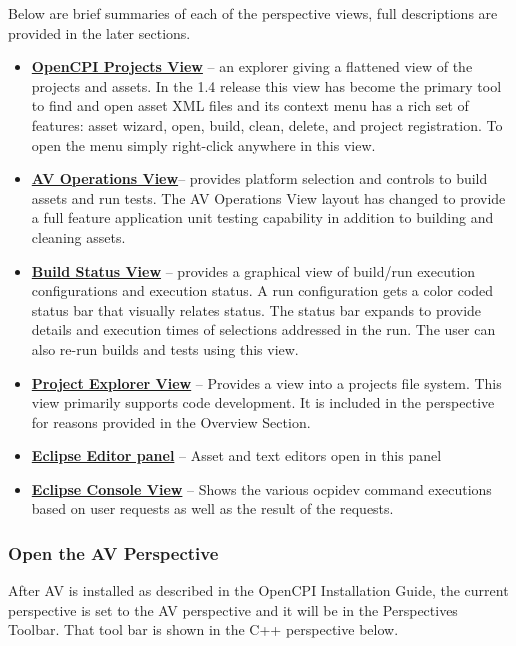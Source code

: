 Below are brief summaries of each of the perspective views, full descriptions are provided in the later sections.
\begin{itemize}
\item []	\hyperlink{OpenCPI Projects View Features}{\textbf{OpenCPI Projects View}} – an explorer giving a flattened view of the projects and assets. In the 1.4 release this view has become the primary tool to find and open asset XML files and its context menu has a rich set of features: asset wizard, open, build, clean, delete, and project registration. To open the menu simply right-click anywhere in this view.
\item [] \hyperlink{Operations View }{\textbf{AV Operations View}}– provides platform selection and controls to build assets and run tests. The AV Operations View layout has changed to provide a full feature application unit testing capability in addition to building and cleaning assets.
\item []	\hyperlink{Build Status View Features}{\textbf{Build Status View}} – provides a graphical view of build/run execution configurations and execution status. A run configuration gets a color coded status bar that visually relates status. The status bar expands to provide details and execution times of selections addressed in the run. The user can also re-run builds and tests using this view.
\item [] \hyperlink{Project Explorer View}{\textbf{Project Explorer View}} – Provides a view into a projects file system. This view primarily supports code development. It is included in the perspective for reasons provided in the Overview Section.
\item [] \hyperlink{Editor panel} {\textbf{Eclipse Editor panel}} – Asset and text editors open in this panel
\item [] \hyperlink{Eclipse Console View} {\textbf{Eclipse Console View}} – Shows the various ocpidev command executions based on user requests as well as the result of the requests.
\end{itemize}
\subsubsection{Open the AV Perspective}
 After AV is installed as described in the OpenCPI Installation Guide, the current perspective is set to the AV perspective and it will be in the Perspectives Toolbar.  That tool bar is shown in the C++ perspective below. \\

